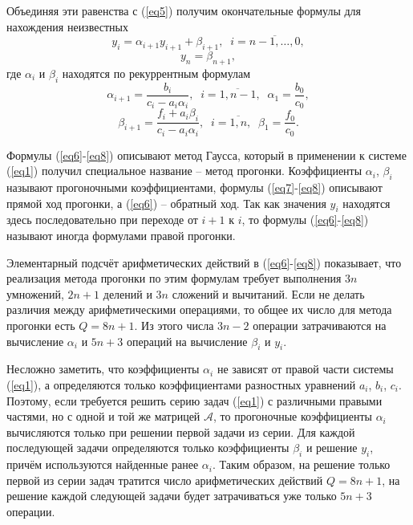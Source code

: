 \documentclass[
11pt,
master, %
subf, %
href, %
colorlinks=true, %
times, %
]{disser}
\begin{document}
Объединяя эти равенства с (\ref{eq5}) получим окончательные формулы для нахождения неизвестных
 \begin{equation}\label{eq6}
    y_i = \alpha_{i+1} y_{i+1} + \beta_{i+1},\;\;i = \overline{n-1,\ldots,0},
\end{equation}
$$y_n = \beta_{n+1},$$
где $\alpha_i$ и $\beta_i$ находятся по рекуррентным формулам
 \begin{equation}\label{eq7}
    \alpha_{i+1} = \frac{b_i}{c_i - a_i \alpha_i},\;\; i = \overline{1, n-1},\;\;\alpha_1 = \frac{b_0}{c_0},
\end{equation}
\begin{equation}\label{eq8}
    \beta_{i+1} = \frac{f_i + a_i \beta_i}{c_i - a_i \alpha_i},\;\; i = \overline{1, n},\;\; \beta_1 = \frac{f_0}{c_0}.
\end{equation}

Формулы (\ref{eq6}-\ref{eq8}) описывают метод Гаусса, который в применении к системе (\ref{eq1}) получил специальное название -- метод прогонки. Коэффициенты $\alpha_i$, $\beta_i$ называют прогоночными коэффициентами, формулы (\ref{eq7}-\ref{eq8}) описывают прямой ход прогонки, а (\ref{eq6}) -- обратный ход. Так как значения $y_i$ находятся здесь последовательно при переходе от $i + 1$ к $i$, то формулы (\ref{eq6}-\ref{eq8}) называют иногда формулами правой прогонки.

Элементарный подсчёт арифметических действий в (\ref{eq6}-\ref{eq8}) показывает, что реализация метода прогонки по этим формулам требует выполнения $3n$ умножений, $2n + 1$ делений и $3n$ сложений и вычитаний. Если не делать различия между арифметическими операциями, то общее их число для метода прогонки есть $Q = 8n+1$. Из этого числа $3n - 2$ операции затрачиваются на вычисление $\alpha_i$ и $5n + 3$ операций на вычисление $\beta_i$ и $y_i$.

Несложно заметить, что коэффициенты $\alpha_i$ не зависят от правой части системы (\ref{eq1}), а определяются только коэффициентами разностных уравнений $a_i$, $b_i$, $c_i$. Поэтому, если требуется решить серию задач (\ref{eq1}) с различными правыми частями, но с одной и той же матрицей $\mathcal{A}$, то прогоночные коэффициенты $\alpha_i$ вычисляются только при решении первой задачи из серии. Для каждой последующей задачи определяются только коэффициенты $\beta_i$ и решение $y_i$, причём используются найденные ранее $\alpha_i$. Таким образом, на решение только первой из серии задач тратится число арифметических действий $Q = 8n + 1$, на решение каждой следующей задачи будет затрачиваться уже только $5n + 3$ операции.
\end{document}
